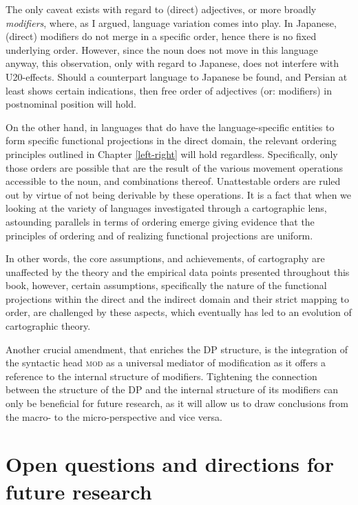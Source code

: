 \documentclass [output=book,colorlinks,citecolor=brown]{langscibook}
\begin{document}
The only caveat exists with regard to (direct) adjectives, or more broadly \textit{modifiers}, where, as I argued, language variation comes into play. In Japanese, (direct) modifiers do not merge in a specific order, hence there is no fixed underlying order. However, since the noun does not move in this language anyway, this observation, only with regard to Japanese, does not interfere with U20-effects. Should a counterpart language to Japanese be found, and Persian at least shows certain indications, then free order of adjectives (or: modifiers) in postnominal position will hold.

On the other hand, in languages that do have the language-specific entities to form specific functional projections in the direct domain, the relevant ordering principles outlined in Chapter \ref{left-right} will hold regardless. Specifically, only those orders are possible that are the result of the various movement operations accessible to the noun, and combinations thereof. Unattestable orders are ruled out by virtue of not being derivable by these operations. It is a fact that when we looking at the variety of languages investigated through a cartographic lens, astounding parallels in terms of ordering emerge \citep[sec. 2]{cinque:2025:superiority} giving evidence that the principles of ordering and of realizing functional projections are uniform.

In other words, the core assumptions, and achievements, of cartography are unaffected by the theory and the empirical data points presented throughout this book, however, certain assumptions, specifically the nature of the functional projections within the direct and the indirect domain and their strict mapping to order, are challenged by these aspects, which eventually has led to an evolution of cartographic theory.

Another crucial amendment, that enriches the DP structure, is the integration of the syntactic head \textsc{mod} as a universal mediator of modification as it offers a reference to the internal structure of modifiers. Tightening the connection between the structure of the DP and the internal structure of its modifiers can only be beneficial for future research, as it will allow us to draw conclusions from the macro- to the micro-perspective and vice versa.

\section{Open questions and directions for future research}
\end{document}
